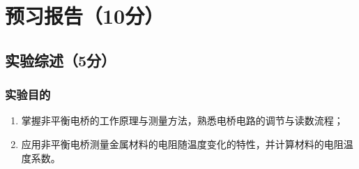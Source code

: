 \documentclass[]{../template/Report}%
\begin{document}
\maketitle%

\section{预习报告（10分）}
\subsection{实验综述（5分）}

\subsubsection{实验目的}
\begin{enumerate}
	\item 掌握非平衡电桥的工作原理与测量方法，熟悉电桥电路的调节与读数流程；
	\item 应用非平衡电桥测量金属材料的电阻随温度变化的特性，并计算材料的电阻温度系数。
\end{enumerate}
\end{document}
